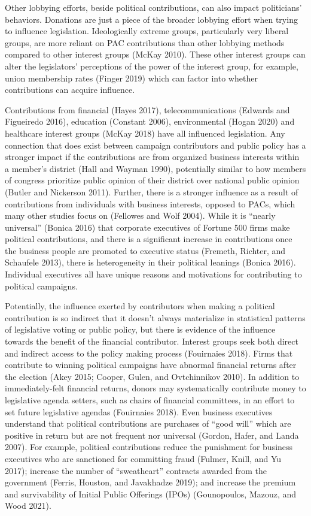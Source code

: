 \documentclass[12pt,]{article}
\begin{document}
Other lobbying efforts, beside political contributions, can also impact
politicians' behaviors. Donations are just a piece of the broader
lobbying effort when trying to influence legislation. Ideologically
extreme groups, particularly very liberal groups, are more reliant on
PAC contributions than other lobbying methods compared to other interest
groups (McKay 2010). These other interest groups can alter the
legislators' perceptions of the power of the interest group, for
example, union membership rates (Finger 2019) which can factor into
whether contributions can acquire influence.

Contributions from financial (Hayes 2017), telecommunications (Edwards
and Figueiredo 2016), education (Constant 2006), environmental (Hogan
2020) and healthcare interest groups (McKay 2018) have all influenced
legislation. Any connection that does exist between campaign
contributors and public policy has a stronger impact if the
contributions are from organized business interests within a member's
district (Hall and Wayman 1990), potentially similar to how members of
congress prioritize public opinion of their district over national
public opinion (Butler and Nickerson 2011). Further, there is a stronger
influence as a result of contributions from individuals with business
interests, opposed to PACs, which many other studies focus on (Fellowes
and Wolf 2004). While it is ``nearly universal'' (Bonica 2016) that
corporate executives of Fortune 500 firms make political contributions,
and there is a significant increase in contributions once the business
people are promoted to executive status (Fremeth, Richter, and Schaufele
2013), there is heterogeneity in their political leanings (Bonica 2016).
Individual executives all have unique reasons and motivations for
contributing to political campaigns.

Potentially, the influence exerted by contributors when making a
political contribution is so indirect that it doesn't always materialize
in statistical patterns of legislative voting or public policy, but
there is evidence of the influence towards the benefit of the financial
contributor. Interest groups seek both direct and indirect access to the
policy making process (Fouirnaies 2018). Firms that contribute to
winning political campaigns have abnormal financial returns after the
election (Akey 2015; Cooper, Gulen, and Ovtchinnikov 2010). In addition
to immediately-felt financial returns, donors may systematically
contribute money to legislative agenda setters, such as chairs of
financial committees, in an effort to set future legislative agendas
(Fouirnaies 2018). Even business executives understand that political
contributions are purchases of ``good will'' which are positive in
return but are not frequent nor universal (Gordon, Hafer, and Landa
2007). For example, political contributions reduce the punishment for
business executives who are sanctioned for committing fraud (Fulmer,
Knill, and Yu 2017); increase the number of ``sweatheart'' contracts
awarded from the government (Ferris, Houston, and Javakhadze 2019); and
increase the premium and survivability of Initial Public Offerings
(IPOs) (Gounopoulos, Mazouz, and Wood 2021).
\end{document}
